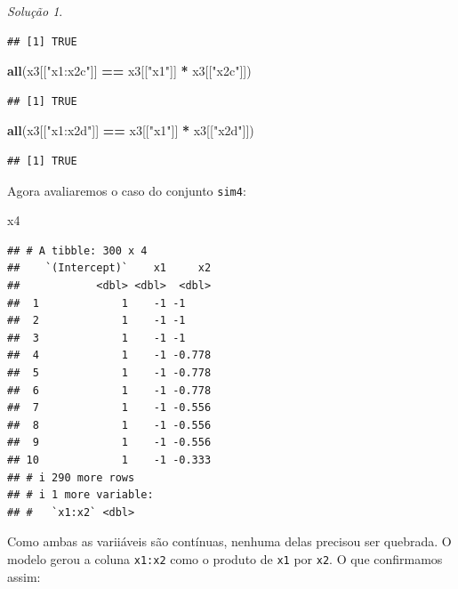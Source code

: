 \documentclass[
]{latex/krantz}
\newenvironment{Shaded}{\begin{snugshade}}{\end{snugshade}}
\newcommand{\FunctionTok}[1]{\textcolor[rgb]{0.13,0.29,0.53}{\textbf{#1}}}
\newcommand{\NormalTok}[1]{#1}
\newcommand{\SpecialCharTok}[1]{\textcolor[rgb]{0.81,0.36,0.00}{\textbf{#1}}}
\newcommand{\StringTok}[1]{\textcolor[rgb]{0.31,0.60,0.02}{#1}}
\theoremstyle{definition}
\theoremstyle{definition}
\theoremstyle{definition}
\theoremstyle{definition}
\theoremstyle{remark}
\newtheorem*{solution}{Solução}
\begin{document}
\begin{solution}
\begin{verbatim}
## [1] TRUE
\end{verbatim}

\begin{Shaded}
\begin{Highlighting}[]
\FunctionTok{all}\NormalTok{(x3[[}\StringTok{"x1:x2c"}\NormalTok{]] }\SpecialCharTok{==}\NormalTok{ x3[[}\StringTok{"x1"}\NormalTok{]] }\SpecialCharTok{*}\NormalTok{ x3[[}\StringTok{"x2c"}\NormalTok{]])}
\end{Highlighting}
\end{Shaded}

\begin{verbatim}
## [1] TRUE
\end{verbatim}

\begin{Shaded}
\begin{Highlighting}[]
\FunctionTok{all}\NormalTok{(x3[[}\StringTok{"x1:x2d"}\NormalTok{]] }\SpecialCharTok{==}\NormalTok{ x3[[}\StringTok{"x1"}\NormalTok{]] }\SpecialCharTok{*}\NormalTok{ x3[[}\StringTok{"x2d"}\NormalTok{]])}
\end{Highlighting}
\end{Shaded}

\begin{verbatim}
## [1] TRUE
\end{verbatim}

Agora avaliaremos o caso do conjunto \texttt{sim4}:

\begin{Shaded}
\begin{Highlighting}[]
\NormalTok{x4}
\end{Highlighting}
\end{Shaded}

\begin{verbatim}
## # A tibble: 300 x 4
##    `(Intercept)`    x1     x2
##            <dbl> <dbl>  <dbl>
##  1             1    -1 -1    
##  2             1    -1 -1    
##  3             1    -1 -1    
##  4             1    -1 -0.778
##  5             1    -1 -0.778
##  6             1    -1 -0.778
##  7             1    -1 -0.556
##  8             1    -1 -0.556
##  9             1    -1 -0.556
## 10             1    -1 -0.333
## # i 290 more rows
## # i 1 more variable:
## #   `x1:x2` <dbl>
\end{verbatim}

Como ambas as variiáveis são contínuas, nenhuma delas precisou ser quebrada. O modelo gerou a coluna \texttt{x1:x2} como o produto de \texttt{x1} por \texttt{x2}. O que confirmamos assim:


\end{solution}
\end{document}

